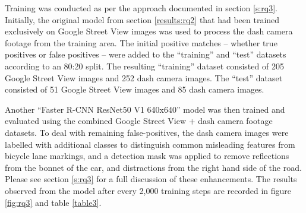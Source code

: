 \documentclass[11pt,twoside]{report}
\begin{document}
Training was conducted as per the approach documented in section \ref{s:rq3}.  Initially, the original model from section \ref{results:rq2} that had been trained exclusively on Google Street View images was used to process the dash camera footage from the training area.  The initial positive matches -- whether true positives or false positives -- were added to the ``training'' and ``test'' datasets according to an 80:20 split.  The resulting ``training'' dataset consisted of 205 Google Street View images and 252 dash camera images.  The ``test'' dataset consisted of 51 Google Street View images and 85 dash camera images.

Another ``Faster R-CNN ResNet50 V1 640x640'' model was then trained and evaluated using the combined Google Street View + dash camera footage datasets.  To deal with remaining false-positives, the dash camera images were labelled with additional classes to distinguish common misleading features from bicycle lane markings, and a detection mask was applied to remove reflections from the bonnet of the car, and distractions from the right hand side of the road.  Please see section \ref{s:rq3} for a full discussion of these enhancements.  The results observed from the model after every 2,000 training steps are recorded in figure \ref{fig:rq3} and table \ref{table3}.
\end{document}
